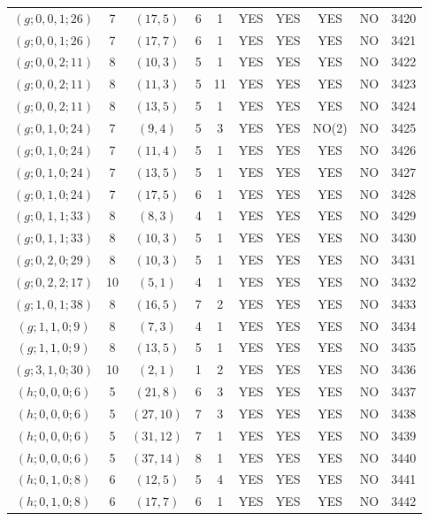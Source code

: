 \begin{longtable}{|c|c|c|c|c|c|c|c|c|c|}
$(g; 0, 0, 1; 26)$ & 7 & $(17, 5)$ & 6 & 1 & YES & YES & YES & NO & 3420\\
$(g; 0, 0, 1; 26)$ & 7 & $(17, 7)$ & 6 & 1 & YES & YES & YES & NO & 3421\\
$(g; 0, 0, 2; 11)$ & 8 & $(10, 3)$ & 5 & 1 & YES & YES & YES & NO & 3422\\
$(g; 0, 0, 2; 11)$ & 8 & $(11, 3)$ & 5 & 11 & YES & YES & YES & NO & 3423\\
$(g; 0, 0, 2; 11)$ & 8 & $(13, 5)$ & 5 & 1 & YES & YES & YES & NO & 3424\\
$(g; 0, 1, 0; 24)$ & 7 & $(9, 4)$ & 5 & 3 & YES & YES & NO(2) & NO & 3425\\
$(g; 0, 1, 0; 24)$ & 7 & $(11, 4)$ & 5 & 1 & YES & YES & YES & NO & 3426\\
$(g; 0, 1, 0; 24)$ & 7 & $(13, 5)$ & 5 & 1 & YES & YES & YES & NO & 3427\\
$(g; 0, 1, 0; 24)$ & 7 & $(17, 5)$ & 6 & 1 & YES & YES & YES & NO & 3428\\
$(g; 0, 1, 1; 33)$ & 8 & $(8, 3)$ & 4 & 1 & YES & YES & YES & NO & 3429\\
$(g; 0, 1, 1; 33)$ & 8 & $(10, 3)$ & 5 & 1 & YES & YES & YES & NO & 3430\\
$(g; 0, 2, 0; 29)$ & 8 & $(10, 3)$ & 5 & 1 & YES & YES & YES & NO & 3431\\
$(g; 0, 2, 2; 17)$ & 10 & $(5, 1)$ & 4 & 1 & YES & YES & YES & NO & 3432\\
$(g; 1, 0, 1; 38)$ & 8 & $(16, 5)$ & 7 & 2 & YES & YES & YES & NO & 3433\\
$(g; 1, 1, 0; 9)$ & 8 & $(7, 3)$ & 4 & 1 & YES & YES & YES & NO & 3434\\
$(g; 1, 1, 0; 9)$ & 8 & $(13, 5)$ & 5 & 1 & YES & YES & YES & NO & 3435\\
$(g; 3, 1, 0; 30)$ & 10 & $(2, 1)$ & 1 & 2 & YES & YES & YES & NO & 3436\\
$(h; 0, 0, 0; 6)$ & 5 & $(21, 8)$ & 6 & 3 & YES & YES & YES & NO & 3437\\
$(h; 0, 0, 0; 6)$ & 5 & $(27, 10)$ & 7 & 3 & YES & YES & YES & NO & 3438\\
$(h; 0, 0, 0; 6)$ & 5 & $(31, 12)$ & 7 & 1 & YES & YES & YES & NO & 3439\\
$(h; 0, 0, 0; 6)$ & 5 & $(37, 14)$ & 8 & 1 & YES & YES & YES & NO & 3440\\
$(h; 0, 1, 0; 8)$ & 6 & $(12, 5)$ & 5 & 4 & YES & YES & YES & NO & 3441\\
$(h; 0, 1, 0; 8)$ & 6 & $(17, 7)$ & 6 & 1 & YES & YES & YES & NO & 3442\\

\end{longtable}
